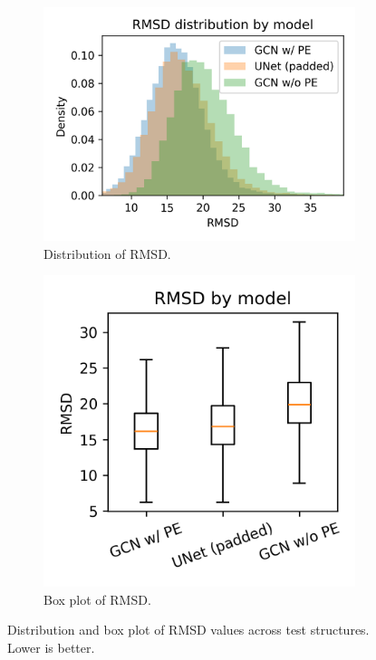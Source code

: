 \documentclass[a4paper,12pt]{article}
\begin{document}
\begin{figure}[htbp]
    \centering
    \begin{subfigure}[b]{0.57\textwidth}
        \centering
        \includegraphics[width=\linewidth]{rmsd_dist.png}
        \caption{Distribution of RMSD.}
        \label{fig:rmsd-hist}
    \end{subfigure}
    \begin{subfigure}[b]{0.42\textwidth}
        \centering
        \includegraphics[width=\linewidth]{rmsd_box.png}
        \caption{Box plot of RMSD.}
        \label{fig:rmsd-box}
    \end{subfigure}
    \caption{Distribution and box plot of RMSD values across test structures. Lower is better.}
    \label{fig:rmsd-dist-box-plot}
\end{figure}
\end{document}
